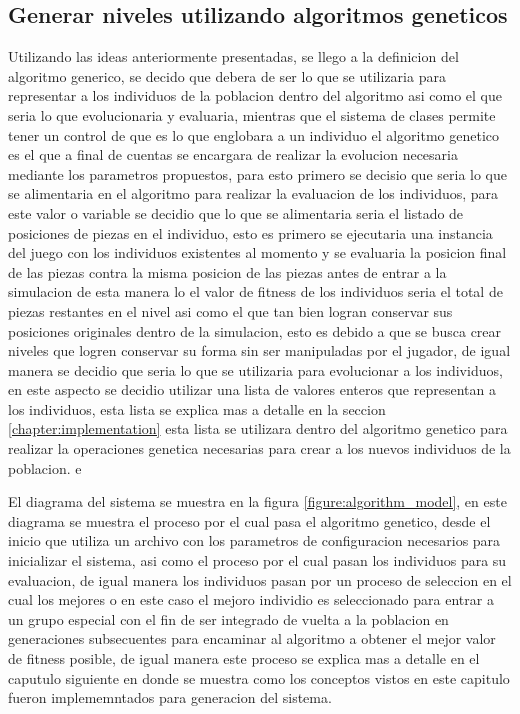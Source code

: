\subsection{Generar niveles utilizando algoritmos geneticos}
\label{subsection:generate-levels-using-GA}

Utilizando las ideas anteriormente presentadas, se llego a la definicion del
algoritmo generico, se decido que debera de ser lo que se utilizaria para
representar a los individuos de la poblacion dentro del algoritmo asi como el
que seria lo que evolucionaria y evaluaria, mientras que el sistema de clases
permite tener un control de que es lo que englobara a un individuo el algoritmo
genetico es el que a final de cuentas se encargara de realizar la evolucion
necesaria mediante los parametros propuestos, para esto primero se decisio que
seria lo que se alimentaria en el algoritmo para realizar la evaluacion de los
individuos, para este valor o variable se decidio que lo que se alimentaria
seria el listado de posiciones de piezas en el individuo, esto es primero se
ejecutaria una instancia del juego con los individuos existentes al momento y se
evaluaria la posicion final de las piezas contra la misma posicion de las piezas
antes de entrar a la simulacion de esta manera lo el valor de fitness de los
individuos seria el total de piezas restantes en el nivel asi como el que tan
bien logran conservar sus posiciones originales dentro de la simulacion, esto es
debido a que se busca crear niveles que logren conservar su forma sin ser
manipuladas por el jugador, de igual manera se decidio que seria lo que se
utilizaria para evolucionar a los individuos, en este aspecto se decidio
utilizar una lista de valores enteros que representan a los individuos, esta
lista se explica mas a detalle en la seccion \ref{chapter:implementation} esta
lista se utilizara dentro del algoritmo genetico para realizar la operaciones
genetica necesarias para crear a los nuevos individuos de la poblacion. e

El diagrama del sistema se muestra en la figura \ref{figure:algorithm_model}, en
este diagrama se muestra el proceso por el cual pasa el algoritmo genetico, desde
el inicio que utiliza un archivo con los parametros de configuracion necesarios
para inicializar el sistema, asi como el proceso por el cual pasan los
individuos para su evaluacion, de igual manera los individuos pasan por un
proceso de seleccion en el cual los mejores o en este caso el mejoro individio
es seleccionado para entrar a un grupo especial con el fin de ser integrado de
vuelta a la poblacion en generaciones subsecuentes para encaminar al algoritmo a
obtener el mejor valor de fitness posible, de igual manera este proceso se
explica mas a detalle en el caputulo siguiente en donde se muestra como los
conceptos vistos en este capitulo fueron implememntados para generacion del
sistema.

